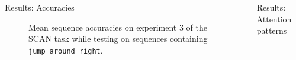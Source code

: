 \documentclass[final,hyperref={pdfpagelabels=false}]{beamer}
\begin{document}
\begin{frame}[t]
\begin{columns}[t]
\begin{column}{.465\textwidth}
\begin{block}{Results: Accuracies}
	\begin{figure}
		
		\caption{Mean sequence accuracies on experiment 3 of the SCAN task while testing on sequences containing \texttt{jump around right}.}
	\end{figure}
	
\end{block}


\end{column} %

\begin{column}{.03\textwidth}\end{column} %
 
\begin{column}{.465\textwidth} %


\begin{block}{Results: Attention patterns}


\end{block}
\end{column}
\end{columns}
\end{frame}
\end{document}
